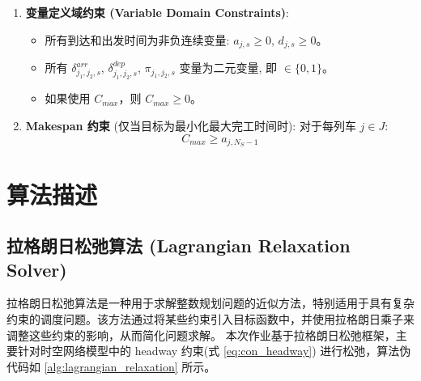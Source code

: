 \documentclass{article}
\begin{document}
\begin{enumerate}
        \item \textbf{变量定义域约束 (Variable Domain Constraints)}:
        \begin{itemize}
            \item 所有到达和出发时间为非负连续变量: $a_{j,s} \ge 0$, $d_{j,s} \ge 0$。
            \item 所有 $\delta^{arr}_{j_1,j_2,s}$,
            $\delta^{dep}_{j_1,j_2,s}$, $\pi_{j_1,j_2,s}$
            变量为二元变量, 即 $\in \{0,1\}$。
            \item 如果使用 $C_{max}$，则 $C_{max} \ge 0$。
        \end{itemize}

        \item \textbf{Makespan 约束} (仅当目标为最小化最大完工时间时): 对于每列车 $j \in J$:
        \begin{equation}
            C_{max} \ge a_{j,N_S-1}\label{eq:makespan_constraint}
        \end{equation}
    \end{enumerate}


    \section{算法描述}
    \label{sec:algo_desc}

    \subsection{拉格朗日松弛算法 (Lagrangian Relaxation Solver)}\label{subsec:-(lagrangian-relaxation-solver)}
    拉格朗日松弛算法是一种用于求解整数规划问题的近似方法，特别适用于具有复杂约束的调度问题。该方法通过将某些约束引入目标函数中，并使用拉格朗日乘子来调整这些约束的影响，从而简化问题求解。
    本次作业基于拉格朗日松弛框架，主要针对时空网络模型中的 headway 约束(式 \ref{eq:con_headway})
    进行松弛，算法伪代码如 \ref{alg:lagrangian_relaxation} 所示。
\end{document}
